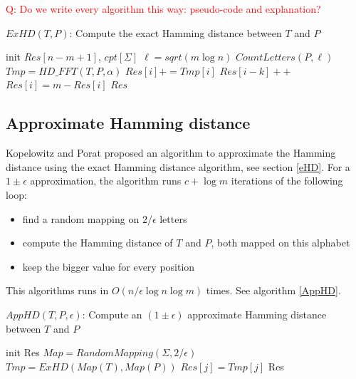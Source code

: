 \documentclass[preprint,12pt]{elsarticle}
\begin{document}
\textcolor{red}{Q: Do we write every algorithm this way: pseudo-code and explanation?}


\begin{algorithm}
\label{ExHD}
\caption{$ExHD(T, P)$: Compute the exact Hamming distance between $T$ and $P$}
\begin{algorithmic}
\STATE init $Res[n-m+1]$, $cpt[\Sigma]$
\STATE $\ell = sqrt(m \log n)$
\STATE $CountLetters(P, \ell)$ 
		\STATE $Tmp = HD\_FFT(T, P, \alpha)$
			\STATE $Res[i] += Tmp[i]$
		\ENDFOR
		\ENDIF
\ENDFOR
{}
			\STATE $Res[i - k]++$ 
		\ENDFOR
	\ENDIF
\ENDFOR
{}
	\STATE $Res[i] = m - Res[i]$
\ENDFOR
\RETURN $Res$

\end{algorithmic}
\end{algorithm}




\subsection{Approximate Hamming distance}

Kopelowitz and Porat \cite{ApproxHD} proposed an algorithm to approximate the Hamming distance
using the exact Hamming distance algorithm, see section \ref{eHD}.
For a $1 \pm \epsilon$ approximation,
the algorithm runs $c+\log m$ iterations of the following loop:
\begin{itemize}
\setlength\itemsep{0.1em}
\item find a random mapping on $2 / \epsilon$ letters
\item compute the Hamming distance of $T$ and $P$, both mapped on this alphabet
\item keep  the bigger value for every position
\end{itemize}

This algorithms runs in $O(n / \epsilon \log n \log m)$ times.
See algorithm \ref{AppHD}.


\begin{algorithm}
\label{AppHD}
\caption{$AppHD(T, P, \epsilon)$: Compute an $(1 \pm \epsilon)$ approximate Hamming distance between $T$ and $P$}
\begin{algorithmic}

\STATE init Res
\FOR {$i$ in $0, c * \log m]$}
	\STATE $Map = RandomMapping(\Sigma, 2 / \epsilon)$
	\STATE $Tmp = ExHD(Map(T), Map(P))$
			\STATE $Res[j]=Tmp[j]$
		\ENDIF
	\ENDFOR
\ENDFOR
\RETURN Res

\end{algorithmic}
\end{algorithm}
\end{document}
